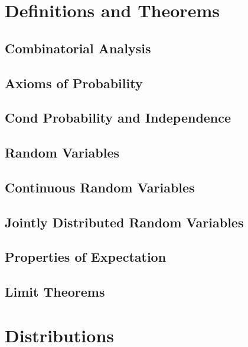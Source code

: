 \documentclass[10pt]{article}
\begin{document}
\setlength{\abovedisplayskip}{0pt}
\setlength{\abovedisplayshortskip}{0pt}
\setlength{\belowdisplayskip}{0pt}
\setlength{\belowdisplayshortskip}{0pt}
\begin{multicols*}{3}
\section{Definitions and Theorems}
\subsection{Combinatorial Analysis}


\subsection{Axioms of Probability}


\subsection{Cond Probability and Independence}


\subsection{Random Variables}


\subsection{Continuous Random Variables}


\subsection{Jointly Distributed Random Variables}


\subsection{Properties of Expectation}


\subsection{Limit Theorems}


\section{Distributions}

\end{multicols*}
\end{document}
